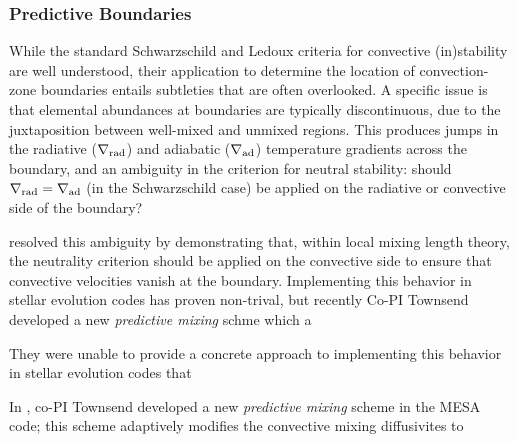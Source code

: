 {\color{brown}
\subsubsection{Predictive Boundaries}

While the standard Schwarzschild and Ledoux criteria for convective (in)stability are well understood, their application to determine the location of convection-zone boundaries entails subtleties that are often overlooked. A specific issue is that elemental abundances at boundaries are typically discontinuous, due to the juxtaposition between well-mixed and unmixed regions. This produces jumps in the radiative ($\nabla_{\rm rad}$) and adiabatic ($\nabla_{\rm ad}$) temperature gradients across the boundary, and an ambiguity in the criterion for neutral stability: should $\nabla_{\rm rad}=\nabla_{\rm ad}$ (in the Schwarzschild case) be applied on the radiative or convective side of the boundary?

\citet{Gabriel:2014} resolved this ambiguity by demonstrating that, within local mixing length theory, the neutrality criterion should be applied on the convective side to ensure that convective velocities vanish at the boundary. Implementing this behavior in stellar evolution codes has proven non-trival, but recently Co-PI Townsend developed a new \emph{predictive mixing} schme which a

They were unable to provide a concrete approach to implementing this behavior in stellar evolution codes that

In \citet{Paxton:2017}, co-PI Townsend developed a new \emph{predictive mixing} scheme in the MESA code; this scheme adaptively modifies the convective mixing diffusivites to 

}
